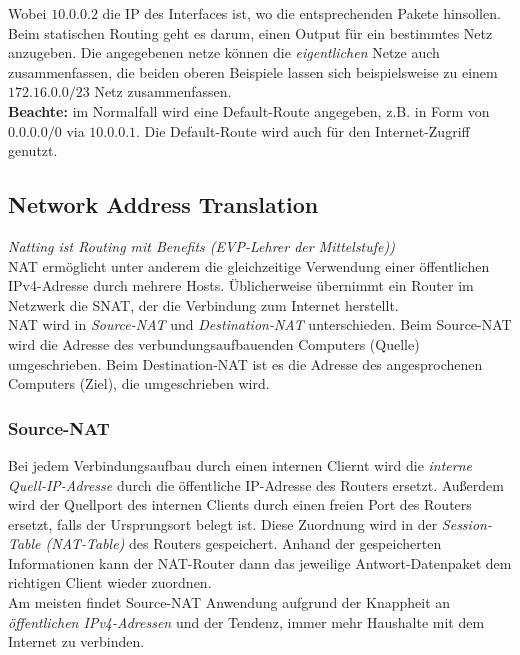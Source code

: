 \documentclass[a4paper, 12pt]{report}
\begin{document}
\begin{multicols}{2}
Wobei $10.0.0.2$ die IP des Interfaces ist, wo die entsprechenden Pakete
hinsollen. Beim statischen Routing geht es darum, einen Output für ein
bestimmtes Netz anzugeben. Die angegebenen netze können die \emph{eigentlichen}
Netze auch zusammenfassen, die beiden oberen Beispiele lassen sich
beispielsweise zu einem $172.16.0.0/23$ Netz zusammenfassen. \\

\textbf{Beachte:} im Normalfall wird eine Default-Route angegeben, z.B. in Form
von $0.0.0.0/0$ via $10.0.0.1$. Die Default-Route wird auch für den
Internet-Zugriff genutzt.

\subsection{Network Address Translation}

\noindent \emph{Natting ist Routing mit Benefits (EVP-Lehrer der Mittelstufe))}\\

NAT ermöglicht unter anderem die gleichzeitige Verwendung einer öffentlichen
IPv4-Adresse durch mehrere Hosts. Üblicherweise übernimmt ein Router im Netzwerk
die SNAT, der die Verbindung zum Internet herstellt. \\

NAT wird in \emph{Source-NAT} und \emph{Destination-NAT} unterschieden. Beim
Source-NAT wird die Adresse des verbundungsaufbauenden Computers (Quelle)
umgeschrieben. Beim Destination-NAT ist es die Adresse des angesprochenen
Computers (Ziel), die umgeschrieben wird.

\subsubsection{Source-NAT}

Bei jedem Verbindungsaufbau durch einen internen Cliernt wird die \emph{interne
Quell-IP-Adresse} durch die öffentliche IP-Adresse des Routers ersetzt. Außerdem
wird der Quellport des internen Clients durch einen freien Port des Routers
ersetzt, falls der Ursprungsort belegt ist. Diese Zuordnung wird in der
\emph{Session-Table (NAT-Table)} des Routers gespeichert. Anhand der
gespeicherten Informationen kann der NAT-Router dann das jeweilige
Antwort-Datenpaket dem richtigen Client wieder zuordnen. \\

Am meisten findet Source-NAT Anwendung aufgrund der Knappheit an
\emph{öffentlichen IPv4-Adressen} und der Tendenz, immer mehr Haushalte mit dem
Internet zu verbinden.


\end{multicols}
\end{document}
